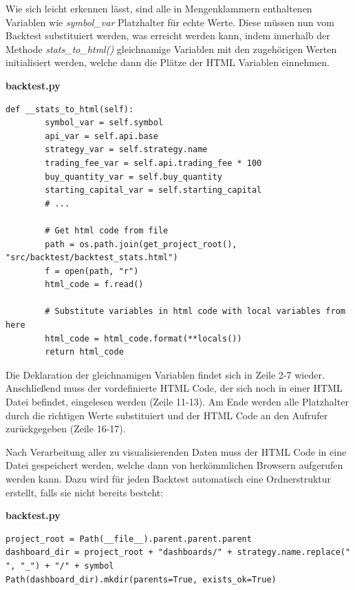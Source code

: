 \documentclass[oneside]{ausarbeitung}
\begin{document}
\newpage
Wie sich leicht erkennen lässt, sind alle in Mengenklammern enthaltenen Variablen wie \textit{symbol\_var} Platzhalter für echte Werte. Diese müssen nun vom Backtest substituiert werden, was erreicht werden kann, indem innerhalb der Methode \textit{stats\_to\_html()} gleichnamige Variablen mit den zugehörigen Werten initialisiert werden, welche dann die Plätze der HTML Variablen einnehmen.

\lstset{language=Python}
\lstset{frame=lines}
\lstset{basicstyle=\footnotesize}
\textbf{backtest.py}
\begin{lstlisting}
def __stats_to_html(self):
        symbol_var = self.symbol
        api_var = self.api.base
        strategy_var = self.strategy.name
        trading_fee_var = self.api.trading_fee * 100
        buy_quantity_var = self.buy_quantity
        starting_capital_var = self.starting_capital
        # ...

        # Get html code from file
        path = os.path.join(get_project_root(), "src/backtest/backtest_stats.html")
        f = open(path, "r")
        html_code = f.read()

        # Substitute variables in html code with local variables from here
        html_code = html_code.format(**locals())
        return html_code
\end{lstlisting}

Die Deklaration der gleichnamigen Variablen findet sich in Zeile 2-7 wieder. Anschließend muss der vordefinierte HTML Code, der sich noch in einer HTML Datei befindet, eingelesen werden (Zeile 11-13). Am Ende werden alle Platzhalter durch
die richtigen Werte substituiert und der HTML Code an den Aufrufer zurückgegeben (Zeile 16-17).

Nach Verarbeitung aller zu visualisierenden Daten muss der HTML Code in eine Datei gespeichert werden, welche dann von herkömmlichen Browsern aufgerufen werden kann. Dazu wird für jeden Backtest automatisch eine Ordnerstruktur erstellt, falls sie nicht bereits besteht:

\lstset{language=Python}
\lstset{frame=lines}
\lstset{basicstyle=\footnotesize}
\textbf{backtest.py}
\begin{lstlisting}
project_root = Path(__file__).parent.parent.parent
dashboard_dir = project_root + "dashboards/" + strategy.name.replace(" ", "_") + "/" + symbol
Path(dashboard_dir).mkdir(parents=True, exists_ok=True)
\end{lstlisting}
\end{document}
